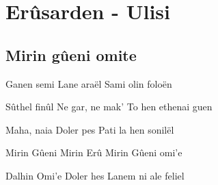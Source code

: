 \documentclass{article}
\newenvironment{album}[1]%
{%
  \section*{#1}
}%
{%
}
\newenvironment{song}[1]%
{%
  \subsection*{\textbf{#1}}
  \begin{multicols*}{2}
}%
{%
  \end{multicols*}
  \newpage
}
\newenvironment{couplet} %
{%
  \verbatim
}%
{% end code
  \endverbatim
}
\newenvironment{refrain} %
{%
  \verbatim
}%
{% end code
  \endverbatim
}
\begin{document}
\begin{album}{Erûsarden - Ulisi}
\begin{song}{Mirin gûeni omite}
\begin{couplet}
Ganen semi
Lane araël
Sami olin foloën  
\end{couplet}
\begin{couplet}
Sûthel finûl
Ne gar, ne mak'
To hen ethenai guen  
\end{couplet}
\begin{couplet}
Maha,  naia
Doler pes
Pati la hen sonilël  
\end{couplet}
\begin{refrain}
Mirin Gûeni
Mirin Erû
Mirin Gûeni omi'e  
\end{refrain}
\begin{couplet}
Dalhin Omi'e
Doler hes
Lanem ni ale feliel  
\end{couplet}
\end{song}

\end{album}
\end{document}
